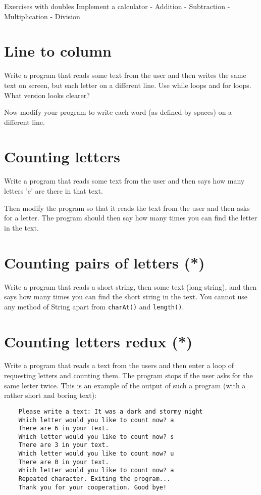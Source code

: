 \documentclass{article}
\begin{document}
Exercises with doubles
  Implement a calculator
    - Addition
    - Subtraction
    - Multiplication
    - Division

\section{Line to column}
\label{sec:line-column}

Write a program that reads some text from the user and then writes the
same text on screen, but each letter on a different line. 
Use while loops and for loops. What version looks clearer?

Now modify your program to write each word (as defined by spaces) on a
different line. 

\section{Counting letters}
\label{sec:counting-letters}

Write a program that reads some text from the user and then says how
many letters 'e' are there in that text. 

Then modify the program so that it reads the text from the user and
then asks for a letter. The program should then say how many times you
can find the letter in the text. 

\section{Counting pairs of letters (*)}
\label{sec:count-pairs-lett}

Write a program that reads a short string, then some text (long string), and
then says how many times you can find the short string in the
text. You cannot use any method of String apart from \verb+charAt()+
and \verb+length()+. 

\section{Counting letters redux (*)}
\label{sec:count-lett-redux}

Write a program that reads a text from the users and then enter a loop
of requesting letters and counting them. The program stops if the user
asks for the same letter twice. This is an example of the output of
such a program (with a rather short and boring text): 

\begin{verbatim}
    Please write a text: It was a dark and stormy night
    Which letter would you like to count now? a
    There are 6 in your text. 
    Which letter would you like to count now? s
    There are 3 in your text. 
    Which letter would you like to count now? u
    There are 0 in your text. 
    Which letter would you like to count now? a
    Repeated character. Exiting the program...
    Thank you for your cooperation. Good bye!
\end{verbatim}
\end{document}

